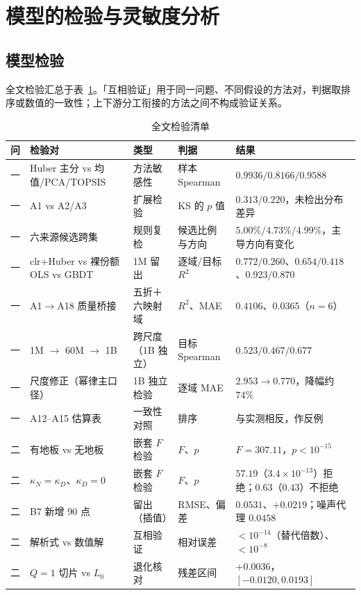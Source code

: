 \section{模型的检验与灵敏度分析}
\label{sec:6}

\subsection{模型检验}
\label{sec:6.1}

全文检验汇总于表~\ref{tab:checks}。「互相验证」用于同一问题、不同假设的方法对，判据取排序或数值的一致性；上下游分工衔接的方法之间不构成验证关系。

\begin{table}[H]
\centering\footnotesize
\caption{全文检验清单}
\label{tab:checks}
\begin{tabularx}{\textwidth}{@{}c p{3.85cm}p{1.55cm}p{2.25cm}X@{}}
\toprule
问 & 检验对 & 类型 & 判据 & 结果 \\
\midrule
一 & Huber 主分 vs 均值/PCA/TOPSIS & 方法敏感性 & 样本 Spearman & $0.9936/0.8166/0.9588$ \\
一 & A1 vs A2/A3 & 扩展检验 & KS 的 $p$ 值 & $0.313/0.220$，未检出分布差异 \\
一 & 六来源候选跨集 & 规则复检 & 候选比例与方向 & $5.00\%/4.73\%/4.99\%$，主导方向有变化 \\
一 & clr+Huber vs 裸份额 OLS vs GBDT & 1M 留出 & 逐域/目标 $R^2$ & $0.772/0.260$、$0.654/0.418$、$0.923/0.870$ \\
一 & A1$\to$A18 质量桥接 & 五折＋六映射域 & $R^2$、MAE & $0.4106$、$0.0365$（$n=6$） \\
一 & 1M $\to$ 60M $\to$ 1B & 跨尺度（1B 独立） & 目标 Spearman & $0.523/0.467/0.677$ \\
一 & 尺度修正（幂律主口径） & 1B 独立检验 & 逐域 MAE & $2.953\to0.770$，降幅约 $74\%$ \\
一 & A12–A15 估算表 & 一致性对照 & 排序 & 与实测相反，作反例 \\
二 & 有地板 vs 无地板 & 嵌套 $F$ 检验 & $F$、$p$ & $F=307.11$，$p<10^{-15}$ \\
二 & $\kappa_N=\kappa_D$、$\kappa_D=0$ & 嵌套 $F$ 检验 & $F$、$p$ & $57.19$（$3.4\times10^{-13}$）拒绝；$0.63$（$0.43$）不拒绝 \\
二 & B7 新增 90 点 & 留出（插值） & RMSE、偏差 & $0.0531$、$+0.0219$；噪声代理 $0.0458$ \\
二 & 解析式 vs 数值解 & 互相验证 & 相对误差 & $<10^{-14}$（替代倍数）、$<10^{-8}$ \\
二 & $Q=1$ 切片 vs $L_0$ & 退化核对 & 残差区间 & $+0.0036$，$[-0.0120,0.0193]$ \\

\end{tabularx}
\end{table}
